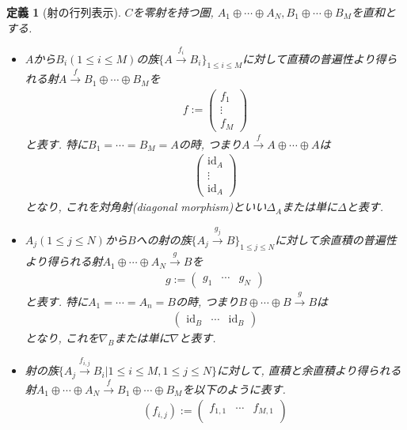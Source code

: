 \documentclass[a4paper,12pt]{ltjsarticle}
\theoremstyle{break}
\newtheorem{defn}[thm]{定義}
\newcommand{\xr}[1]{\xrightarrow{#1}}
\newcommand{\id}{\mathrm{id}}
\newcommand{\opl}{\oplus}
\numberwithin{equation}{section}
\begin{document}
\begin{defn}[射の行列表示]
  $C$を零射を持つ圏, $A_1 \opl \cdots \opl A_N, B_1 \opl \cdots \opl B_M$を直和とする. 
  \begin{itemize}
    \item $A$から$B_i(1 \leq i \leq M)$の族$\{ A \xr{f_i} B_i \}_{1 \leq i \leq M}$に対して直積の普遍性より得られる射$A \xr{f} B_1 \opl \cdots \opl B_M$を
    \begin{align*}
      f :=
      \begin{pmatrix}
        f_1 \\
        \vdots \\
        f_M
      \end{pmatrix}
    \end{align*}
    と表す. 
    特に$B_1= \cdots = B_M=A$の時, つまり$A \xr{f} A \opl \cdots \opl A$は
    \begin{align*}
      \begin{pmatrix}
        \id_A \\
        \vdots \\
        \id_A
      \end{pmatrix}
    \end{align*}
    となり, これを対角射(diagonal morphism)といい$\Delta_A$または単に$\Delta$と表す. 
    \item $A_j(1 \leq j \leq N)$から$B$への射の族$\{ A_j \xr{g_j} B \}_{1 \leq j \leq N}$に対して余直積の普遍性より得られる射$A_1 \opl \cdots \opl A_N \xr{g} B$を
    \begin{align*}
      g :=
      \begin{pmatrix}
        g_1 & \cdots & g_N
      \end{pmatrix}
    \end{align*}
    と表す. 
    特に$A_1= \cdots =A_n=B$の時, つまり$B \opl \cdots \opl B \xr{g} B$は
    \begin{align*}
      \begin{pmatrix}
        \id_B & \cdots & \id_B
      \end{pmatrix} 
    \end{align*}
    となり, これを$\nabla_B$または単に$\nabla$と表す. 
    \item 射の族$\{ A_j \xr{f_{i,j}} B_i | 1 \leq i \leq M, 1 \leq j \leq N\}$に対して, 直積と余直積より得られる射$A_1 \opl \cdots \opl A_N \xr{f} B_1 \opl \cdots \opl B_M$を以下のように表す. 
    \begin{align*}
      (f_{i,j}) := 
      \begin{pmatrix}
        f_{1,1} & \cdots & f_{M,1} \\

\end{pmatrix}
\end{align*}
\end{itemize}
\end{defn}
\end{document}
